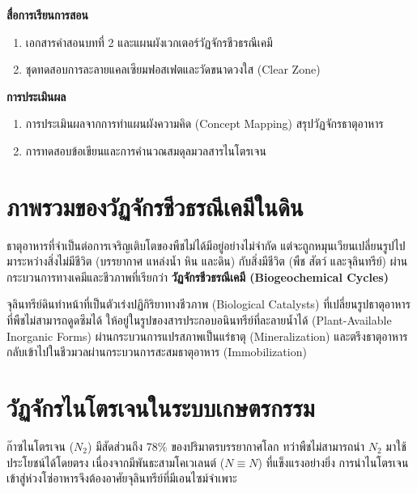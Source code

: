 \noindent\textbf{สื่อการเรียนการสอน}
\begin{enumerate}
    \item เอกสารคำสอนบทที่ 2 และแผนผังเวกเตอร์วัฏจักรชีวธรณีเคมี
    \item ชุดทดสอบการละลายแคลเซียมฟอสเฟตและวัดขนาดวงใส (Clear Zone)
\end{enumerate}

\noindent\textbf{การประเมินผล}
\begin{enumerate}
    \item การประเมินผลจากการทำแผนผังความคิด (Concept Mapping) สรุปวัฏจักรธาตุอาหาร
    \item การทดสอบข้อเขียนและการคำนวณสมดุลมวลสารไนโตรเจน
\end{enumerate}

\newpage


\section{ภาพรวมของวัฏจักรชีวธรณีเคมีในดิน}

ธาตุอาหารที่จำเป็นต่อการเจริญเติบโตของพืชไม่ได้มีอยู่อย่างไม่จำกัด แต่จะถูกหมุนเวียนเปลี่ยนรูปไปมาระหว่างสิ่งไม่มีชีวิต (บรรยากาศ แหล่งน้ำ หิน และดิน) กับสิ่งมีชีวิต (พืช สัตว์ และจุลินทรีย์) ผ่านกระบวนการทางเคมีและชีวภาพที่เรียกว่า \textbf{วัฏจักรชีวธรณีเคมี (Biogeochemical Cycles)}

จุลินทรีย์ดินทำหน้าที่เป็นตัวเร่งปฏิกิริยาทางชีวภาพ (Biological Catalysts) ที่เปลี่ยนรูปธาตุอาหารที่พืชไม่สามารถดูดซึมได้ ให้อยู่ในรูปของสารประกอบอนินทรีย์ที่ละลายน้ำได้ (Plant-Available Inorganic Forms) ผ่านกระบวนการแปรสภาพเป็นแร่ธาตุ (Mineralization) และตรึงธาตุอาหารกลับเข้าไปในชีวมวลผ่านกระบวนการสะสมธาตุอาหาร (Immobilization)

\section{วัฏจักรไนโตรเจนในระบบเกษตรกรรม}

ก๊าซไนโตรเจน ($N_2$) มีสัดส่วนถึง 78\% ของปริมาตรบรรยากาศโลก ทว่าพืชไม่สามารถนำ $N_2$ มาใช้ประโยชน์ได้โดยตรง เนื่องจากมีพันธะสามโคเวเลนต์ ($N \equiv N$) ที่แข็งแรงอย่างยิ่ง การนำไนโตรเจนเข้าสู่ห่วงโซ่อาหารจึงต้องอาศัยจุลินทรีย์ที่มีเอนไซม์จำเพาะ

